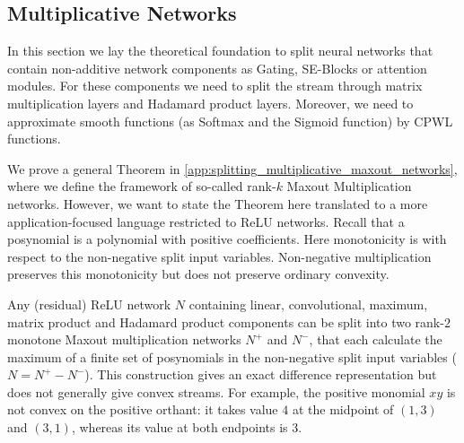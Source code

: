 \subsection{Multiplicative Networks} \label{subsec:polynomial_ops}

In this section we lay the theoretical foundation to split neural networks that contain non-additive network components as Gating, SE-Blocks or attention modules.
For these components we need to split the stream through matrix multiplication layers and Hadamard product layers.
Moreover, we need to approximate smooth functions (as Softmax and the Sigmoid function) by CPWL functions.

We prove a general Theorem in \cref{app:splitting_multiplicative_maxout_networks}, where we define the framework of so-called rank-$k$ Maxout Multiplication networks.
However, we want to state the Theorem here translated to a more application-focused language restricted to ReLU networks.
Recall that a posynomial is a polynomial with positive coefficients.
Here monotonicity is with respect to the non-negative split input variables. Non-negative multiplication preserves this monotonicity but does not preserve ordinary convexity.

\begin{theorem} \label{thm:main_simplified}
    Any (residual) ReLU network $N$ containing linear, convolutional, maximum, matrix product and Hadamard product components can be split into two rank-$2$ monotone Maxout multiplication networks $N^+$ and $N^-$, that each calculate the maximum of a finite set of posynomials in the non-negative split input variables ($N = N^+ - N^-$).
    This construction gives an exact difference representation but does not generally give convex streams. For example, the positive monomial $xy$ is not convex on the positive orthant: it takes value $4$ at the midpoint of $(1,3)$ and $(3,1)$, whereas its value at both endpoints is $3$.
\end{theorem}